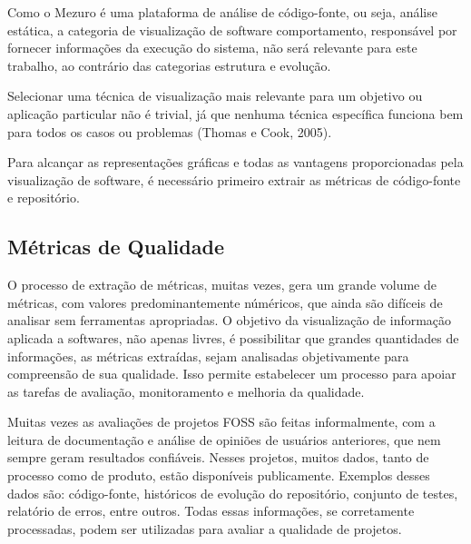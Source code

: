 Como o Mezuro é uma plataforma de análise de código-fonte, ou seja, análise estática, a categoria de visualização de software comportamento, responsável por fornecer informações da execução do sistema, não será relevante para este trabalho, ao contrário das categorias estrutura e evolução.

Selecionar uma técnica de visualização mais relevante para um objetivo ou aplicação particular não é trivial, já que nenhuma técnica específica funciona bem para todos os casos ou problemas (Thomas e Cook, 2005).


Para alcançar as representações gráficas e todas as vantagens proporcionadas pela visualização de software, é necessário primeiro extrair as métricas de código-fonte e repositório.

\subsection{Métricas de Qualidade}

O processo de extração de métricas, muitas vezes, gera um grande volume de métricas, com valores predominantemente núméricos, que ainda são difíceis de analisar sem ferramentas apropriadas. O objetivo da visualização de informação aplicada a softwares, não apenas livres, é possibilitar que grandes quantidades de informações, as métricas extraídas, sejam analisadas objetivamente para compreensão de sua qualidade. Isso permite estabelecer um processo para apoiar as tarefas de avaliação, monitoramento e melhoria da qualidade.

Muitas vezes as avaliações de projetos FOSS são feitas informalmente, com a leitura de documentação e análise de opiniões de usuários anteriores, que nem sempre geram resultados confiáveis. Nesses projetos, muitos dados, tanto de processo como de produto, estão disponíveis publicamente. Exemplos desses dados são: código-fonte, históricos de evolução do repositório, conjunto de testes, relatório de erros, entre outros. Todas essas informações, se corretamente processadas, podem ser utilizadas para avaliar a qualidade de projetos. 

